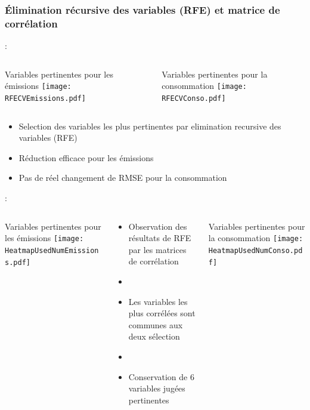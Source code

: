 \documentclass[8pt,aspectratio=169,hyperref={unicode=true}]{beamer}
\begin{document}
\subsubsection{Élimination récursive des variables (RFE) et matrice de corrélation}
\begin{frame}{\insertsection : \insertsubsection}{\insertsubsubsection}
  \begin{columns}[t]
    \begin{column}{.5\textwidth}
      \centering
      Variables pertinentes pour les émissions
      \texttt{[image: RFECVEmissions.pdf]}
    \end{column}
    \begin{column}{.5\textwidth}
      \centering
      Variables pertinentes pour la consommation
      \texttt{[image: RFECVConso.pdf]}
    \end{column}
  \end{columns}
  \begin{itemize}
    \item Selection des variables les plus pertinentes par elimination recursive des variables (RFE)
    \item Réduction efficace pour les émissions
    \item Pas de réel changement de RMSE pour la consommation
  \end{itemize}
\end{frame}

\begin{frame}{\insertsection : \insertsubsection}{\insertsubsubsection}
  \begin{columns}[t]
    \begin{column}{.33\textwidth}
      \centering
      Variables pertinentes pour les émissions
      \texttt{[image: HeatmapUsedNumEmissions.pdf]}
    \end{column}
    \begin{column}{.33\textwidth}
      \begin{itemize}
        \item Observation des résultats de RFE par les matrices de corrélation
        \item[]
        \item Les variables les plus corrélées sont communes aux deux sélection
        \item[]
        \item Conservation de 6 variables jugées pertinentes
      \end{itemize}
    \end{column}
    \begin{column}{.33\textwidth}
      \centering
      Variables pertinentes pour la consommation
      \texttt{[image: HeatmapUsedNumConso.pdf]}
    \end{column}
  \end{columns}
\end{frame}
\end{document}
